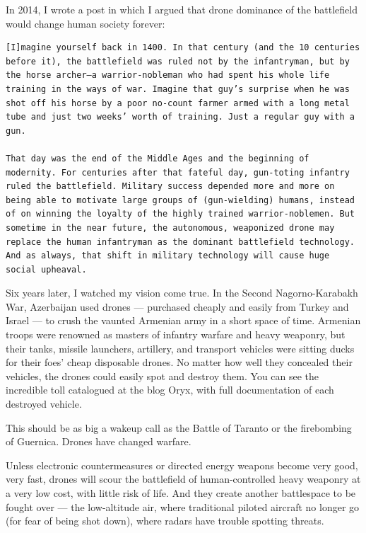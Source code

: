\documentclass[
]{book}
\begin{document}
In 2014, I wrote a post in which I argued that drone dominance of the battlefield would change human society forever:

\begin{verbatim}
[I]magine yourself back in 1400. In that century (and the 10 centuries before it), the battlefield was ruled not by the infantryman, but by the horse archer—a warrior-nobleman who had spent his whole life training in the ways of war. Imagine that guy’s surprise when he was shot off his horse by a poor no-count farmer armed with a long metal tube and just two weeks’ worth of training. Just a regular guy with a gun.

That day was the end of the Middle Ages and the beginning of modernity. For centuries after that fateful day, gun-toting infantry ruled the battlefield. Military success depended more and more on being able to motivate large groups of (gun-wielding) humans, instead of on winning the loyalty of the highly trained warrior-noblemen. But sometime in the near future, the autonomous, weaponized drone may replace the human infantryman as the dominant battlefield technology. And as always, that shift in military technology will cause huge social upheaval.
\end{verbatim}

Six years later, I watched my vision come true. In the Second Nagorno-Karabakh War, Azerbaijan used drones --- purchased cheaply and easily from Turkey and Israel --- to crush the vaunted Armenian army in a short space of time. Armenian troops were renowned as masters of infantry warfare and heavy weaponry, but their tanks, missile launchers, artillery, and transport vehicles were sitting ducks for their foes' cheap disposable drones. No matter how well they concealed their vehicles, the drones could easily spot and destroy them. You can see the incredible toll catalogued at the blog Oryx, with full documentation of each destroyed vehicle.

This should be as big a wakeup call as the Battle of Taranto or the firebombing of Guernica. Drones have changed warfare.

Unless electronic countermeasures or directed energy weapons become very good, very fast, drones will scour the battlefield of human-controlled heavy weaponry at a very low cost, with little risk of life. And they create another battlespace to be fought over --- the low-altitude air, where traditional piloted aircraft no longer go (for fear of being shot down), where radars have trouble spotting threats.
\end{document}

